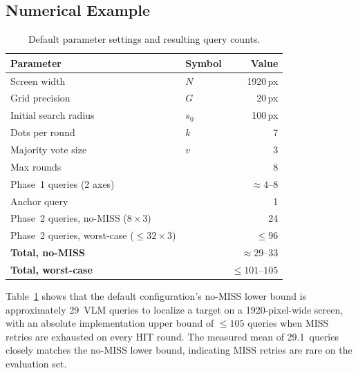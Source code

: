 \documentclass[sigconf,nonacm]{acmart}
\begin{document}
\subsection{Numerical Example}
\label{sec:numerical}

\begin{table}[t]
\caption{Default parameter settings and resulting query counts.}
\label{tab:numerical}
\begin{tabular}{llr}
\toprule
\textbf{Parameter} & \textbf{Symbol} & \textbf{Value} \\
\midrule
Screen width & $N$ & 1920\,px \\
Grid precision & $G$ & 20\,px \\
Initial search radius & $s_0$ & 100\,px \\
Dots per round & $k$ & 7 \\
Majority vote size & $v$ & 3 \\
Max rounds & & 8 \\
\midrule
Phase~1 queries (2 axes) & & $\approx 4$--8 \\
Anchor query & & 1 \\
Phase~2 queries, no-MISS ($8 \times 3$) & & 24 \\
Phase~2 queries, worst-case ($\le 32 \times 3$) & & $\le 96$ \\
\midrule
\textbf{Total, no-MISS} & & $\approx 29$--33 \\
\textbf{Total, worst-case} & & $\le 101$--$105$ \\
\bottomrule
\end{tabular}
\end{table}

Table~\ref{tab:numerical} shows that the default configuration's
no-MISS lower bound is approximately 29~VLM queries to localize a
target on a 1920-pixel-wide screen, with an absolute implementation
upper bound of $\le 105$ queries when MISS retries are exhausted on
every HIT round.  The measured mean of 29.1~queries closely matches
the no-MISS lower bound, indicating MISS retries are rare on the
evaluation set.

\begin{table}[t]
\caption{Scaling comparison: exhaustive search vs.\ Monte Carlo
  Pinpoint Phase~2 ($v=3$ votes per round).}
\label{tab:scaling}
\end{table}
\end{document}
